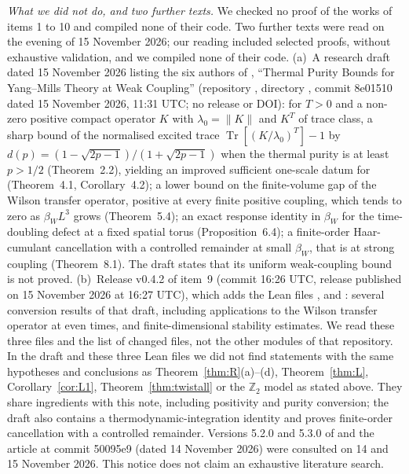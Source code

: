 \documentclass[11pt,a4paper]{article}
\theoremstyle{plain}
\theoremstyle{definition}
\theoremstyle{remark}
\numberwithin{equation}{section}
\begin{document}
\par\medskip\noindent\textit{What we did not do, and two further texts.} We checked no proof of the works of items 1 to 10 and compiled none of their code. Two further texts were read on the evening of 15 November 2026; our reading included selected proofs, without exhaustive validation, and we compiled none of their code. (a)~A research draft dated 15 November 2026 listing the six authors of \cite{BB26v5}, ``Thermal Purity Bounds for Yang--Mills Theory at Weak Coupling'' \cite{BBd26} (repository , directory , commit 8e01510 dated 15 November 2026, 11:31 UTC; no release or DOI): for $T>0$ and a non-zero positive compact operator $K$ with $\lambda_0=\|K\|$ and $K^T$ of trace class, a sharp bound of the normalised excited trace $\operatorname{Tr}[(K/\lambda_0)^T]-1$ by $d(p)=(1-\sqrt{2p-1})/(1+\sqrt{2p-1})$ when the thermal purity is at least $p>1/2$ (Theorem~2.2), yielding an improved sufficient one-scale datum for \cite{BB26v5} (Theorem~4.1, Corollary~4.2); a lower bound on the finite-volume gap of the Wilson transfer operator, positive at every finite positive coupling, which tends to zero as $\beta_WL^3$ grows (Theorem~5.4); an exact response identity in $\beta_W$ for the time-doubling defect at a fixed spatial torus (Proposition~6.4); a finite-order Haar-cumulant cancellation with a controlled remainder at small $\beta_W$, that is at strong coupling (Theorem~8.1). The draft states that its uniform weak-coupling bound is not proved.
(b)~Release v0.4.2 of item~9 (commit 16:26 UTC, release published on 15 November 2026 at 16:27 UTC), which adds the Lean files ,  and : several conversion results of that draft, including applications to the Wilson transfer operator at even times, and finite-dimensional stability estimates. We read these three files and the list of changed files, not the other modules of that repository. In the draft and these three Lean files we did not find statements with the same hypotheses and conclusions as Theorem~\ref{thm:R}(a)--(d), Theorem~\ref{thm:L}, Corollary~\ref{cor:L1}, Theorem~\ref{thm:twistall} or the $\mathbb Z_2$ model as stated above. They share ingredients with this note, including positivity and purity conversion; the draft also contains a thermodynamic-integration identity and proves finite-order cancellation with a controlled remainder. Versions 5.2.0 and 5.3.0 of \cite{BB26} and the article at commit 50095e9 (dated 14 November 2026) were consulted on 14 and 15 November 2026. This notice does not claim an exhaustive literature search.
\end{document}
